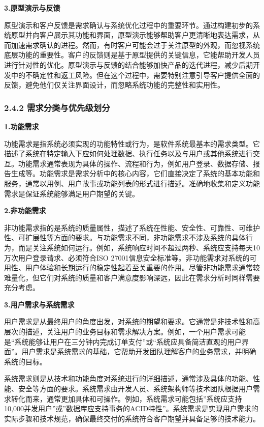 \textbf{3.原型演示与反馈}

原型演示和客户反馈是需求确认与系统优化过程中的重要环节。通过构建初步的系统原型并向客户展示其功能和界面，原型演示能够帮助客户更清晰地表达需求，从而加速需求确认的进程。然而，有时客户可能会过于关注原型的外观，而忽视系统底层功能的重要性。客户的反馈则是基于原型提供的关键信息，它能帮助开发人员进行针对性的优化。原型演示与反馈的结合能够加快产品的迭代进程，减少后期开发中的不确定性和返工风险。但在这个过程中，需要特别注意引导客户提供全面的反馈，避免他们仅关注界面设计，而忽略系统功能的完整性和实用性。

\subsubsection{2.4.2 需求分类与优先级划分}\label{ux9700ux6c42ux5206ux7c7bux4e0eux4f18ux5148ux7ea7ux5212ux5206}

\textbf{1.功能需求}

功能需求是指系统必须实现的功能特性或行为，是软件系统最基本的需求类型。它描述了系统在特定输入下应如何处理数据、执行任务以及与用户或其他系统进行交互。功能需求通常表现为具体的操作、流程和行为，例如用户登录、数据存储、报告生成等。功能需求是需求分析中的核心内容，它们直接决定了系统的基本功能和服务，通常以用例、用户故事或功能列表的形式进行描述。准确地收集和定义功能需求是保证系统能够满足用户期望的关键。

\textbf{2.非功能需求}

非功能需求指的是系统的质量属性，描述了系统在性能、安全性、可靠性、可维护性、可扩展性等方面的要求。与功能需求不同，非功能需求不涉及系统的具体行为，而是关注系统如何运行。例如，系统响应时间不超过两秒、系统应支持每天10万次用户登录请求、必须符合ISO 27001信息安全标准等。非功能需求对系统的可用性、用户体验和长期运行的稳定性起着至关重要的作用。尽管非功能需求通常较难量化，但它们对系统的质量和客户满意度影响深远，因此在需求分析时同样需要充分考虑。

\textbf{3.用户需求与系统需求}

用户需求是从最终用户的角度出发，对系统的期望和要求。它通常是非技术性和高层次的描述，关注用户的业务目标和需求解决方案。例如，一个用户需求可能是``系统能够让用户在三分钟内完成订单支付''或``系统应具备简洁直观的用户界面''。用户需求是系统需求的基础，它帮助开发团队理解客户的业务需求，并明确系统的目标。

系统需求则是从技术和功能角度对系统进行的详细描述，通常涉及具体的功能、性能、安全等方面的要求。系统需求由开发人员、系统架构师等技术团队根据用户需求转化而来，通常更加具体和可操作。例如，系统需求可能包括''系统应支持10,000并发用户''或''数据库应支持事务的ACID特性''。系统需求是实现用户需求的实际步骤和技术规范，确保最终交付的系统符合客户期望并具备足够的技术能力。

